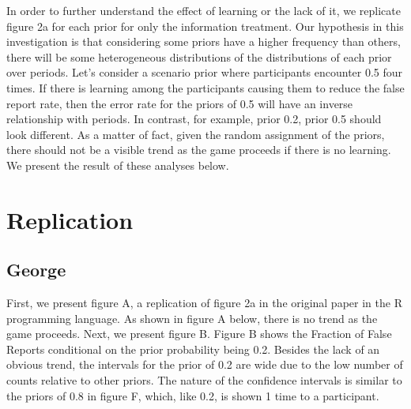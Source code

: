 \documentclass[12pt,a4paper]{article}
\begin{document}
	\hspace *{0mm} In order to further understand the effect of learning or the lack of it, we replicate figure 2a for each prior for only the information treatment. Our hypothesis in this investigation is that considering some priors have a higher frequency than others, there will be some heterogeneous distributions of the distributions of each prior over periods. Let's consider a scenario prior where participants encounter 0.5 four times. If there is learning among the participants causing them to reduce the false report rate, then the error rate for the priors of 0.5 will have an inverse relationship with periods. In contrast, for example, prior 0.2, prior 0.5 should look different. As a matter of fact, given the random assignment of the priors, there should not be a visible trend as the game proceeds if there is no learning. We present the result of these analyses below.
	
	\section{Replication}
	
	
	
	
	
	\subsection{George}
	First, we present figure A, a replication of figure 2a in the original paper in the R programming language. As shown in figure A below, there is no trend as the game proceeds. Next, we present figure B. Figure B shows the Fraction of False Reports conditional on the prior probability being 0.2. Besides the lack of an obvious trend, the intervals for the prior of 0.2 are wide due to the low number of counts relative to other priors. The nature of the confidence intervals is similar to the priors of 0.8 in figure F, which, like 0.2, is shown 1 time to a participant.
	
\end{document}
